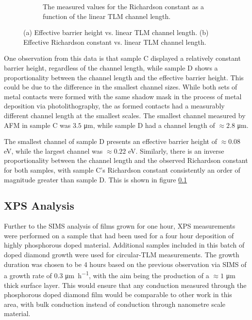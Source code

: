 \begin{figure}[htbp]
\begin{subfigure}[b]{0.49\textwidth}
        \caption{The measured values for the Richardson constant as a function of the linear TLM channel length.}
        \label{fig:richardson}
    \end{subfigure}
    \caption{(a) Effective barrier height vs. linear TLM channel length. (b) Effective Richardson constant vs. linear TLM channel length.}
    \label{fig:side_by_side_barrier_richardson}
\end{figure}

 One observation from this data is that sample C displayed a relatively constant barrier height, regardless of the channel length, while sample D shows a proportionality between the channel length and the effective barrier height. This could be due to the difference in the smallest channel sizes. While both sets of metal contacts were formed with the same shadow mask in the process of metal deposition via photolithography, the as formed contacts had a measurably different channel length at the smallest scales. The smallest channel measured by AFM in sample C was $3.5$ \si{\micro\metre}, while sample D had a channel length of $\approx2.8$ \si{\micro\metre}. 
 
 The smallest channel of sample D presents an effective barrier height of $\approx0.08$ \si{\electronvolt}, while the largest channel was $\approx0.22$ \si{\electronvolt}. Similarly, there is an inverse proportionality between the channel length and the observed Richardson constant for both samples, with sample C's Richardson constant consistently an order of magnitude greater than sample D. This is shown in figure \ref{}

\subsection{XPS Analysis}

Further to the SIMS analysis of films grown for one hour, XPS measurements were performed on a sample that had been used for a four hour deposition of highly phosphorous doped material. Additional samples included in this batch of doped diamond growth were used for circular-TLM measurements. The growth duration was chosen to be 4 hours based on the previous observation via SIMS of a growth rate of 0.3 \si{\micro\metre\per\hour}, with the aim being the production of a $\approx1$ \si{\micro\metre} thick surface layer. This would ensure that any conduction measured through the phosphorous doped diamond film would be comparable to other work in this area, with bulk conduction instead of conduction through nanometre scale material.

